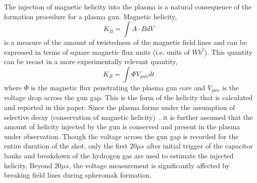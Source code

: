 \documentclass[aps,prl,amsmath,amssymb,reprint,superscriptaddress]{revtex4-1} %
\begin{document}
The injection of magnetic helicity into the plasma is a natural consequence of the formation procedure for a plasma gun. Magnetic helicity,
%
\begin{equation}
K_{B} = \int A \cdot B dV
\label{eq:helicity_th}
\end{equation}
%
is a measure of the amount of twistedness of the magnetic field lines and can be expressed in terms of square magnetic flux units (i.e. units of $Wb^{2}$). This quantity can be recast in a more experimentally relevant quantity, 
%
\begin{equation}
K_{B} = \int \Phi V_{gun} dt
\label{eq:helicity_exp}
\end{equation}
%
where $\Phi$ is the magnetic flux penetrating the plasma gun core and $V_{gun}$ is the voltage drop across the gun gap. This is the form of the helicity that is calculated and reported in this paper. Since the plasma forms under the assumption of selective decay (conservation of magnetic helicity)~\cite{Gray13}, it is further assumed that the amount of helicity injected by the gun is conserved and present in the plasma under observation. Though the voltage across the gun gap is recorded for the entire duration of the shot, only the first $20 \mu s$ after initial trigger of the capacitor banks and breakdown of the hydrogen gas are used to estimate the injected helicity. Beyond $20 \mu s$, the voltage measurement is significantly affected by breaking field lines during spheromak formation.
\end{document}
